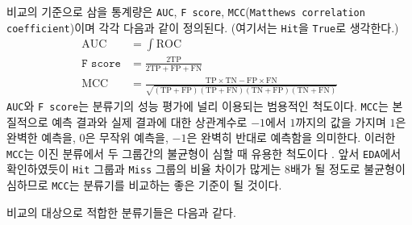 \documentclass[10pt,onecolumn,twoside,a4size]{gsag3jnl}
\begin{document}
비교의 기준으로 삼을 통계량은 \texttt{AUC}, \texttt{F score}, \texttt{MCC}(\texttt{Matthews correlation coefficient})이며 각각 다음과 같이 정의된다. (여기서는 \texttt{Hit}을 \texttt{True}로 생각한다.)
\begin{align}
  \mathrm{AUC}&=\int\mathrm{ROC}\\
  \texttt{F score}&=\frac{2\mathrm{TP}}{2\mathrm{TP}+\mathrm{FP}+\mathrm{FN}}\nonumber\\
  \mathrm{MCC}&=\frac{\mathrm{TP}\times\mathrm{TN}-\mathrm{FP}\times\mathrm{FN}}{\sqrt{(\mathrm{TP}+\mathrm{FP})(\mathrm{TP}+\mathrm{FN})(\mathrm{TN}+\mathrm{FP})(\mathrm{TN}+\mathrm{FN})}}\nonumber
\end{align}
\texttt{AUC}와 \texttt{F score}는 분류기의 성능 평가에 널리 이용되는 범용적인 척도이다. \texttt{MCC}는 본질적으로 예측 결과와 실제 결과에 대한 상관계수로 $-1$에서 $1$까지의 값을 가지며 $1$은 완벽한 예측을, $0$은 무작위 예측을, $-1$은 완벽히 반대로 예측함을 의미한다. 이러한 \texttt{MCC}는 이진 분류에서 두 그룹간의 불균형이 심할 때 유용한 척도이다 \texttt{\citep{chicco2020advantages}}. 앞서 \texttt{EDA}에서 확인하였듯이 \texttt{Hit} 그룹과 \texttt{Miss} 그룹의 비율 차이가 많게는 8배가 될 정도로 불균형이 심하므로 \texttt{MCC}는 분류기를 비교하는 좋은 기준이 될 것이다.

비교의 대상으로 적합한 분류기들은 다음과 같다.
\end{document}
